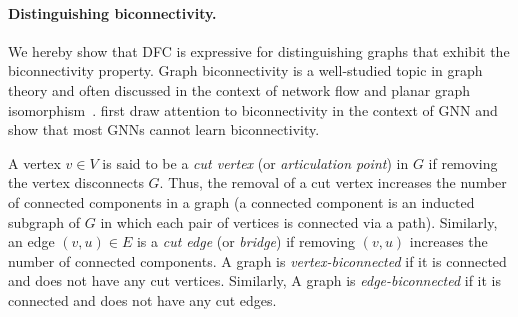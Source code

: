 

\paragraph{Distinguishing biconnectivity.}
We hereby show that DFC is expressive for distinguishing graphs that exhibit the biconnectivity property. %
Graph biconnectivity is a well-studied topic in graph theory and often discussed in the context of network flow and planar graph isomorphism~\citep{Hopcroft1973-lu}. \citet{anonymous2023rethinking} first draw attention to biconnectivity in the context of GNN and show that most GNNs cannot learn biconnectivity. 

A vertex $v\in V$ is said to be a \emph{cut vertex} (or \emph{articulation point}) in $G$ if removing the vertex disconnects $G$. Thus, the removal of a cut vertex increases the number of connected components in a graph (a connected component is an inducted subgraph of $G$ in which each pair of vertices is connected via a path). Similarly, an edge $(v,u)\in E$ is a \emph{cut edge} (or \emph{bridge}) if removing $(v,u)$ increases the number of connected components. A graph is \emph{vertex-biconnected} if it is connected and does not have any cut vertices. Similarly, A graph is \emph{edge-biconnected} if it is connected and does not have any cut edges.


